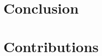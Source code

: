 \documentclass[letterpaper,10pt]{article}
\begin{document}
  \section{Conclusion}


  \section{Contributions}

  
  

  \clearpage
  
  
\end{document}
